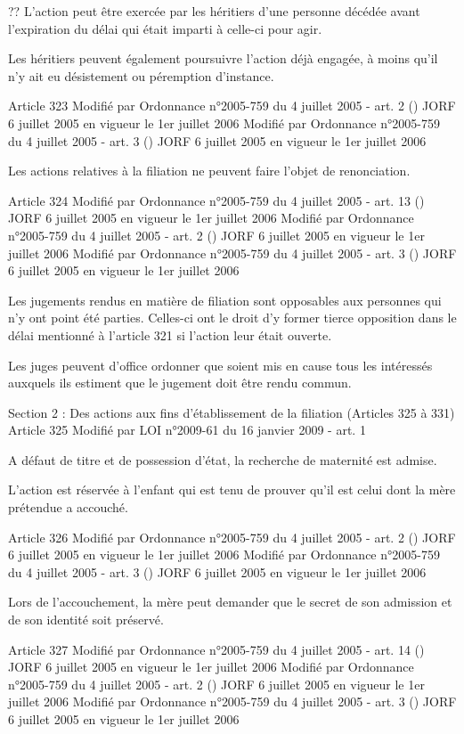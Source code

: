 \documentclass[
  12pt,
]{book}
\begin{document}
\begin{encadre}{??}
L'action peut être exercée par les héritiers d'une personne décédée avant l'expiration du délai qui était imparti à celle-ci pour agir.

Les héritiers peuvent également poursuivre l'action déjà engagée, à moins qu'il n'y ait eu désistement ou péremption d'instance.

Article 323
Modifié par Ordonnance n°2005-759 du 4 juillet 2005 - art. 2 () JORF 6 juillet 2005 en vigueur le 1er juillet 2006
Modifié par Ordonnance n°2005-759 du 4 juillet 2005 - art. 3 () JORF 6 juillet 2005 en vigueur le 1er juillet 2006

Les actions relatives à la filiation ne peuvent faire l'objet de renonciation.

Article 324
Modifié par Ordonnance n°2005-759 du 4 juillet 2005 - art. 13 () JORF 6 juillet 2005 en vigueur le 1er juillet 2006
Modifié par Ordonnance n°2005-759 du 4 juillet 2005 - art. 2 () JORF 6 juillet 2005 en vigueur le 1er juillet 2006
Modifié par Ordonnance n°2005-759 du 4 juillet 2005 - art. 3 () JORF 6 juillet 2005 en vigueur le 1er juillet 2006

Les jugements rendus en matière de filiation sont opposables aux personnes qui n'y ont point été parties. Celles-ci ont le droit d'y former tierce opposition dans le délai mentionné à l'article 321 si l'action leur était ouverte.

Les juges peuvent d'office ordonner que soient mis en cause tous les intéressés auxquels ils estiment que le jugement doit être rendu commun.

Section 2 : Des actions aux fins d'établissement de la filiation (Articles 325 à 331)
Article 325
Modifié par LOI n°2009-61 du 16 janvier 2009 - art. 1

A défaut de titre et de possession d'état, la recherche de maternité est admise.

L'action est réservée à l'enfant qui est tenu de prouver qu'il est celui dont la mère prétendue a accouché.

Article 326
Modifié par Ordonnance n°2005-759 du 4 juillet 2005 - art. 2 () JORF 6 juillet 2005 en vigueur le 1er juillet 2006
Modifié par Ordonnance n°2005-759 du 4 juillet 2005 - art. 3 () JORF 6 juillet 2005 en vigueur le 1er juillet 2006

Lors de l'accouchement, la mère peut demander que le secret de son admission et de son identité soit préservé.

Article 327
Modifié par Ordonnance n°2005-759 du 4 juillet 2005 - art. 14 () JORF 6 juillet 2005 en vigueur le 1er juillet 2006
Modifié par Ordonnance n°2005-759 du 4 juillet 2005 - art. 2 () JORF 6 juillet 2005 en vigueur le 1er juillet 2006
Modifié par Ordonnance n°2005-759 du 4 juillet 2005 - art. 3 () JORF 6 juillet 2005 en vigueur le 1er juillet 2006


\end{encadre}
\end{document}
